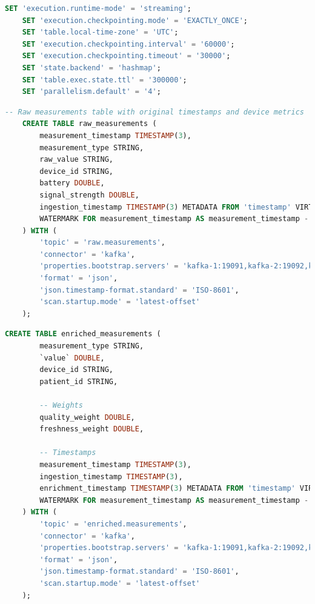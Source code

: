\begin{lstlisting}[language=sql]
    SET 'execution.runtime-mode' = 'streaming';
    SET 'execution.checkpointing.mode' = 'EXACTLY_ONCE';
    SET 'table.local-time-zone' = 'UTC';
    SET 'execution.checkpointing.interval' = '60000';
    SET 'execution.checkpointing.timeout' = '30000';
    SET 'state.backend' = 'hashmap';
    SET 'table.exec.state.ttl' = '300000';
    SET 'parallelism.default' = '4';
\end{lstlisting}

\begin{lstlisting}[language=sql]
    -- Raw measurements table with original timestamps and device metrics
    CREATE TABLE raw_measurements (
        measurement_timestamp TIMESTAMP(3),
        measurement_type STRING,
        raw_value STRING,
        device_id STRING,
        battery DOUBLE,
        signal_strength DOUBLE,
        ingestion_timestamp TIMESTAMP(3) METADATA FROM 'timestamp' VIRTUAL,
        WATERMARK FOR measurement_timestamp AS measurement_timestamp - INTERVAL '10' SECONDS
    ) WITH (
        'topic' = 'raw.measurements',
        'connector' = 'kafka',
        'properties.bootstrap.servers' = 'kafka-1:19091,kafka-2:19092,kafka-3:19093',
        'format' = 'json',
        'json.timestamp-format.standard' = 'ISO-8601',
        'scan.startup.mode' = 'latest-offset'
    );
\end{lstlisting}
\newpage
\begin{lstlisting}[language=sql]
    CREATE TABLE enriched_measurements (
        measurement_type STRING,
        `value` DOUBLE,
        device_id STRING,
        patient_id STRING,
        
        -- Weights
        quality_weight DOUBLE,
        freshness_weight DOUBLE,
        
        -- Timestamps
        measurement_timestamp TIMESTAMP(3),
        ingestion_timestamp TIMESTAMP(3),
        enrichment_timestamp TIMESTAMP(3) METADATA FROM 'timestamp' VIRTUAL,
        WATERMARK FOR measurement_timestamp AS measurement_timestamp - INTERVAL '10' SECONDS
    ) WITH (
        'topic' = 'enriched.measurements',
        'connector' = 'kafka',
        'properties.bootstrap.servers' = 'kafka-1:19091,kafka-2:19092,kafka-3:19093',
        'format' = 'json',
        'json.timestamp-format.standard' = 'ISO-8601',
        'scan.startup.mode' = 'latest-offset'
    );
\end{lstlisting}
\newpage
